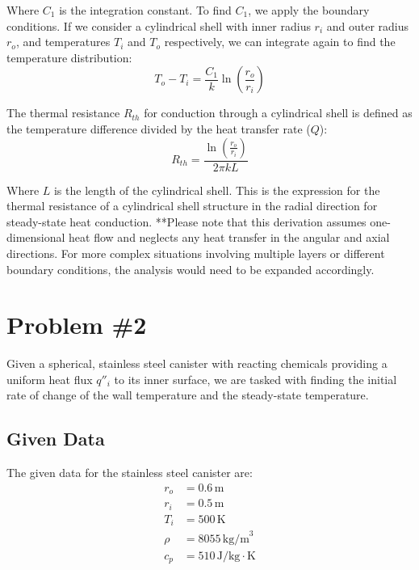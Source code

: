 \documentclass[12pt]{article}
\numberwithin{equation}{section}
\begin{document}
Where \( C_1 \) is the integration constant. To find \( C_1 \), we apply the boundary conditions. If we consider a cylindrical shell with inner radius \( r_i \) and outer radius \( r_o \), and temperatures \( T_i \) and \( T_o \) respectively, we can integrate again to find the temperature distribution:
\begin{equation}
    T_o - T_i = \frac{C_1}{k} \ln\left(\frac{r_o}{r_i}\right)
\end{equation}

The thermal resistance \( R_{th} \) for conduction through a cylindrical shell is defined as the temperature difference divided by the heat transfer rate (\( Q \)):
\begin{equation}
    R_{th} = \frac{\ln\left(\frac{r_o}{r_i}\right)}{2 \pi k L}
\end{equation}

Where \( L \) is the length of the cylindrical shell. This is the expression for the thermal resistance of a cylindrical shell structure in the radial direction for steady-state heat conduction.
\newline\newline
**Please note that this derivation assumes one-dimensional heat flow and neglects any heat transfer in the angular and axial directions. For more complex situations involving multiple layers or different boundary conditions, the analysis would need to be expanded accordingly.

\newpage
\section{Problem \#2}

Given a spherical, stainless steel canister with reacting chemicals providing a uniform heat flux $q''_i$ to its inner surface, we are tasked with finding the initial rate of change of the wall temperature and the steady-state temperature.

\subsection*{Given Data}
The given data for the stainless steel canister are:
\begin{align*}
    r_o & = 0.6 \, \text{m} \\
    r_i & = 0.5 \, \text{m} \\
    T_i & = 500 \, \text{K} \\
    \rho & = 8055 \, \text{kg/m}^3 \\
    c_p & = 510 \, \text{J/kg} \cdot \text{K}
\end{align*}
\end{document}
